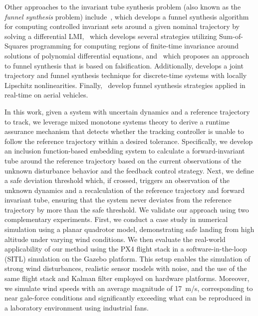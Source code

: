 \documentclass{IEEEojcsys}
\begin{document}
Other approaches to the invariant tube synthesis problem (also known as the \emph{funnel synthesis} problem) include~\cite{BehcetFunnel}, which develops a funnel synthesis algorithm for computing controlled invariant sets around a given nominal trajectory by solving a differential LMI,~\cite{TOBENKINSoS} which develops several strategies utilizing Sum-of-Squares programming for computing regions of finite-time invariance around solutions of polynomial differential equations, and~\cite{FejlekFalsifier} which proposes an approach to funnel synthesis that is based on falsification. Additionally, \cite{kim2023joint} develops a joint trajectory and funnel synthesis technique for discrete-time systems with locally Lipschitz nonlinearities. Finally,~\cite{Reynolds6DOF, MajumdarRealTime} develop funnel synthesis strategies applied in real-time on aerial vehicles.

In this work, given a system with uncertain dynamics and a reference trajectory to track, we leverage mixed monotone systems theory to derive a runtime assurance mechanism that  detects whether the tracking controller
is unable to follow the reference trajectory within a desired tolerance. Specifically, we develop an inclusion function-based embedding system to calculate a forward-invariant tube around the reference trajectory based on the current observations of the unknown disturbance behavior and the feedback control strategy. Next, we define a safe deviation threshold which, if crossed, triggers an observation of the unknown dynamics and a recalculation of the reference trajectory and forward invariant tube, ensuring that the system never deviates from the reference trajectory by more than the safe threshold. We validate our approach using two complementary experiments. First, we conduct a case study in numerical simulation using a planar quadrotor model, demonstrating safe landing from high altitude under varying wind conditions. We then evaluate the real-world applicability of our method using the PX4 flight stack in a software-in-the-loop (SITL) simulation on the Gazebo platform. This setup enables the simulation of strong wind disturbances, realistic sensor models with noise, and the use of the same flight stack and Kalman filter employed on hardware platforms. Moreover, we simulate wind speeds with an average magnitude of \qty{17}{m/s}, corresponding to near gale-force conditions and significantly exceeding what can be reproduced in a laboratory environment using industrial fans.
\end{document}
